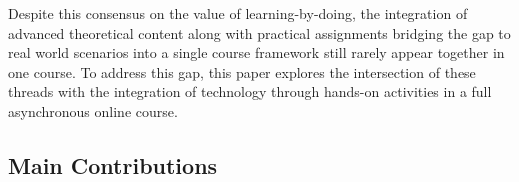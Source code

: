 \documentclass[journal]{IEEEtran}
\begin{document}
Despite this consensus on the value of learning-by-doing, the integration of advanced theoretical content along with practical assignments bridging the gap to real world scenarios into a single course framework still rarely appear together in one course.
%
%
 To address this gap, this paper explores the intersection of these threads with the integration of technology through hands-on activities in a full asynchronous online course.
 





%



\subsection*{Main Contributions}
\end{document}
